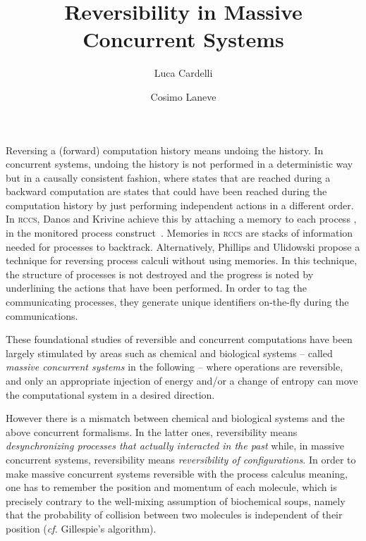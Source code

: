 \documentclass{mecbic}
\title{Reversibility in Massive Concurrent Systems}
\author{Luca Cardelli \institute{Microsoft
Research, Cambridge} \email{luca@microsoft.com} \and Cosimo Laneve \institute{Universit\`a di
Bologna}\email{laneve@cs.unibo.it}}
\newcommand{\rccs}{\textsc{rccs}}
\begin{document}
\maketitle
\pagestyle{plain}
\setcounter{page}{3}

\begin{abstract}

\end{abstract}

Reversing a (forward) computation history
means undoing the history.
In concurrent systems, undoing the history is not performed in a deterministic way but in a
causally consistent fashion, where states that are reached during a
backward computation are states that could have been reached during the
computation history by just performing independent actions in a different
order. In {\rccs}, Danos and Krivine achieve this
by attaching a memory  to each process , in
the monitored process construct~. Memories in {\rccs} are
stacks of information needed for processes to backtrack.
Alternatively, Phillips and Ulidowski propose a technique for reversing process calculi
without using memories. In this technique,
the structure of processes is not destroyed and the progress is noted
by underlining the actions that have been performed. In order to tag the communicating processes, they generate unique identifiers on-the-fly during the communications.

These foundational studies of reversible and concurrent computations
have been largely stimulated by areas such as chemical
and biological systems -- called {\it massive concurrent systems} in the following -- where operations are reversible, and only an appropriate injection of
energy and/or a change of entropy can
move the computational system in a desired direction.


However there is a mismatch between chemical and biological
systems and
the above concurrent formalisms. In the latter ones, reversibility
means {\it desynchronizing processes that actually
interacted in the past} while, in massive concurrent systems,
reversibility means {\it reversibility of
 configurations}. In order
to make massive concurrent systems reversible with the process
calculus meaning,
one has to remember the position and
momentum of each molecule, which is precisely contrary to the well-mixing
assumption of biochemical soups, namely that the probability of collision
between two molecules is independent of their position ({\it cf.} Gillespie's algorithm).
\end{document}
